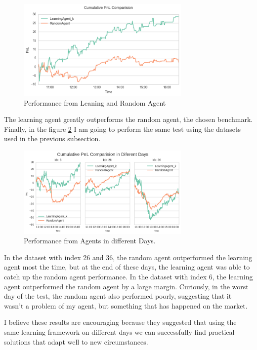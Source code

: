 \documentclass[a4paper]{article}
\begin{document}
\begin{figure}[ht]
\centering
\includegraphics[width=0.75\textwidth]{figures/optimal_vs_random_pnl.png}
\caption{\label{fig:optimal_vs_random_pnl}Performance from Leaning and Random Agent}
\end{figure}

The learning agent greatly outperforms the random agent, the chosen benchmark. Finally, in the figure \ref{fig:pnl_diff_days_compare} I am going to perform the same test using the datasets used in the previous subsection.

\begin{figure}[ht]
\centering
\includegraphics[width=0.75\textwidth]{figures/pnl_diff_days_compare.png}
\caption{\label{fig:pnl_diff_days_compare}Performance from Agents in different Days.}
\end{figure}

In the dataset with index 26 and 36, the random agent outperformed the learning agent most the time, but at the end of these days, the learning agent was able to catch up the random agent performance. In the dataset with index 6, the learning agent outperformed the random agent by a large margin. Curiously, in the worst day of the test, the random agent also performed poorly, suggesting that it wasn't a problem of my agent, but something that has happened on the market.

I believe these results are encouraging because they suggested that using the same learning framework on different days we can successfully find practical solutions that adapt well to new circumstances.
\end{document}
